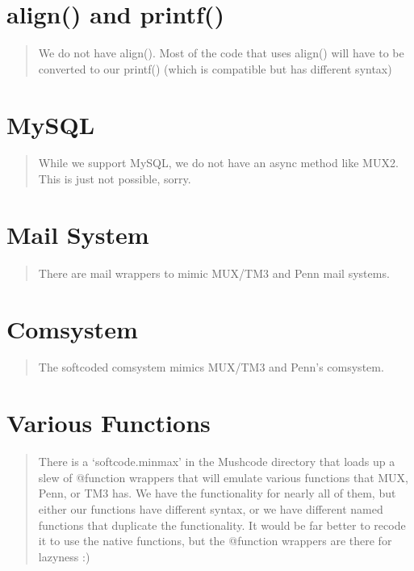 \documentclass[letterpaper,10pt,english]{sphinxmanual}
\begin{document}
\section{align() and printf()}
\label{\detokenize{10-customize:align-and-printf}}\begin{quote}

\sphinxAtStartPar
We do not have align().  Most of the code that uses align() will have to
be converted to our printf() (which is compatible but has different syntax)
\end{quote}


\section{MySQL}
\label{\detokenize{10-customize:mysql}}\begin{quote}

\sphinxAtStartPar
While we support MySQL, we do not have an async method like MUX2.  This
is just not possible, sorry.
\end{quote}


\section{Mail System}
\label{\detokenize{10-customize:mail-system}}\begin{quote}

\sphinxAtStartPar
There are mail wrappers to mimic MUX/TM3 and Penn mail systems.
\end{quote}


\section{Comsystem}
\label{\detokenize{10-customize:comsystem}}\begin{quote}

\sphinxAtStartPar
The softcoded comsystem mimics MUX/TM3 and Penn’s comsystem.
\end{quote}


\section{Various Functions}
\label{\detokenize{10-customize:various-functions}}\begin{quote}

\sphinxAtStartPar
There is a ‘softcode.minmax’ in the Mushcode directory that loads up a slew
of @function wrappers that will emulate various functions that MUX, Penn, or
TM3 has.  We have the functionality for nearly all of them, but either our
functions have different syntax, or we have different named functions that
duplicate the functionality.  It would be far better to recode it to use
the native functions, but the @function wrappers are there for lazyness :)
\end{quote}
\end{document}

